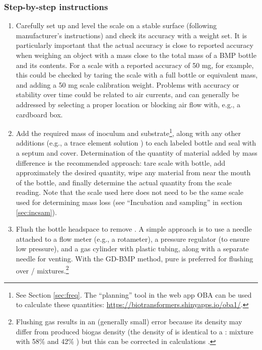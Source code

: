 \documentclass[]{article}
\begin{document}
\subsubsection{Step-by-step instructions}
\begin{enumerate}
  \item Carefully set up and level the scale on a stable surface (following manufacturer's instructions) and check its accuracy with a weight set. 
      It is particularly important that the actual accuracy is close to reported accuracy when weighing an object with a mass close to the total mass of a BMP bottle and its contents. 
      For a scale with a reported accuracy of 50 mg, for example, this could be checked by taring the scale with a full bottle or equivalent mass, and adding a 50 mg scale calibration weight.
      Problems with accuracy or stability over time could be related to air currents, and can generally be addressed by selecting a proper location or blocking air flow with, e.g., a cardboard box.
    \item Add the required mass of inoculum and substrate\footnote{
      See Section \ref{sec:freq}. The ``planning'' tool in the web app OBA can be used to calculate these quantities: \url{https://biotransformers.shinyapps.io/oba1/}. 
    }, along with any other additions (e.g., a trace element solution \citep{holligerStandardizationBiomethanePotential2016}) to each labeled bottle and seal with a septum and cover. 
      Determination of the quantity of material added by mass difference is the recommended approach: tare scale with bottle, add approximately the desired quantity, wipe any material from near the mouth of the bottle, and finally determine the actual quantity from the scale reading. 
      Note that the scale used here does not need to be the same scale used for determining mass loss (see ``Incubation and sampling'' in section \ref{sec:incsam}).
    \item Flush the bottle headspace to remove . 
      A simple approach is to use a needle attached to a flow meter (e.g., a rotameter), a pressure regulator (to ensure low pressure), and a gas cylinder with plastic tubing, along with a separate needle for venting. With the GD-BMP method, pure  is preferred for flushing over / mixtures.\footnote{
        Flushing gas results in an (generally small) error because its density may differ from produced biogas density (the density of  is identical to a : mixture with 58\%  and 42\% ) but this can be corrected in calculations \citep{justesenDevelopmentValidationLowcost2019}.
}
\end{enumerate}
\end{document}
